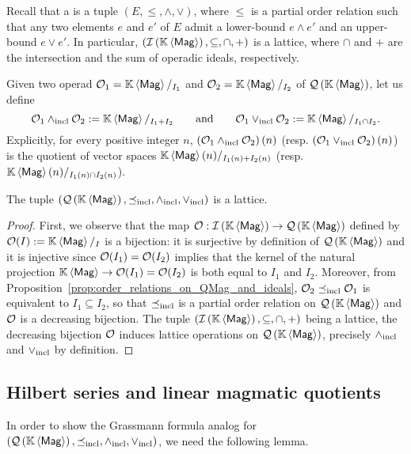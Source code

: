 Recall that a  is a tuple
$\left(E,\leq,\wedge,\vee\right)$, where $\leq$ is a partial order
relation such that any two elements $e$ and $e'$ of $E$ admit a
lower-bound $e\wedge e'$ and an upper-bound $e\vee e'$. In particular,
$\left(\IMag,\subseteq,\cap,+\right)$ is a lattice, where $\cap$ and $+$
are the intersection and the sum of operadic ideals, respectively.
\medbreak

Given two operad $\Oca_1=\KMag/_{I_1}$ and $\Oca_2=\KMag/_{I_2}$ of
$\QMag$, let us define
\begin{equation} \label{equ:definition_of_lattice_operations_of_QMag}
    \Oca_1\InfQMag \Oca_2 := \KMag/_{I_1+I_2}
    \qquad \mbox{and} \qquad
    \Oca_1\SupQMag \Oca_2 := \KMag/_{I_1\cap I_2}.
\end{equation}
Explicitly, for every positive integer $n$,
$\left(\Oca_1\InfQMag\Oca_2\right)(n)$ (resp.
$\left(\Oca_1\SupQMag\Oca_2\right)(n)$) is the quotient of vector spaces
$\KMag(n)/_{I_1(n)+I_2(n)}$ (resp.
$\KMag(n)/_{I_1(n)\cap I_2(n)}$).
\medbreak

\begin{Theorem} \label{thm:lattice_structure_of_QMag}
  The tuple $\LatQMag$ is a lattice.
\end{Theorem}

\begin{proof}
  First, we observe that the map $\Oca:\IMag\to\QMag$ defined by
  $\Oca(I) :=\KMag/_I$ is a bijection: it is surjective by definition of
  $\QMag$ and it is injective since $\Oca(I_1)=\Oca(I_2)$ implies that
  the kernel of the natural projection $\KMag\to\Oca(I_1)=\Oca(I_2)$ is
  both equal to $I_1$ and $I_2$. Moreover, from
  Proposition~\ref{prop:order_relations_on_QMag_and_ideals},
  $\Oca_2\OrdQMag\Oca_1$ is equivalent to $I_1\subseteq I_2$, so that
  $\OrdQMag$ is a partial order relation on $\QMag$ and $\Oca$ is a
  decreasing bijection. The tuple $\left(\IMag,\subseteq,\cap,+\right)$
  being a lattice, the decreasing bijection $\Oca$ induces lattice
  operations on $\QMag$, precisely $\InfQMag$ and $\SupQMag$ by
  definition.
\end{proof}
\medbreak

\subsection{Hilbert series and linear magmatic quotients}
In order to show the Grassmann formula analog for $\LatQMag$, we need the
following lemma.
\medbreak

